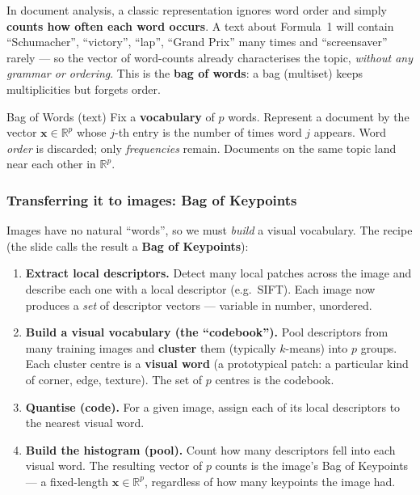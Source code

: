 \documentclass{report}
\newcommand{\R}{\mathbb{R}}
\newcommand{\xvec}{\mathbf{x}}
\begin{document}
In document analysis, a classic representation ignores word order and simply
\textbf{counts how often each word occurs}. A text about Formula~1 will contain
``Schumacher'', ``victory'', ``lap'', ``Grand Prix'' many times and
``screensaver'' rarely --- so the vector of word-counts already characterises
the topic, \emph{without any grammar or ordering}. This is the
\textbf{bag of words}: a bag (multiset) keeps multiplicities but forgets order.

\begin{defbox}{Bag of Words (text)}
Fix a \textbf{vocabulary} of $p$ words. Represent a document by the vector
$\xvec \in \R^p$ whose $j$-th entry is the number of times word $j$ appears.
Word \emph{order} is discarded; only \emph{frequencies} remain. Documents on the
same topic land near each other in $\R^p$.
\end{defbox}

\subsubsection{Transferring it to images: Bag of Keypoints}

Images have no natural ``words'', so we must \emph{build} a visual vocabulary.
The recipe (the slide calls the result a \textbf{Bag of Keypoints}):

\begin{enumerate}
\item \textbf{Extract local descriptors.} Detect many local patches across the
image and describe each one with a local descriptor (e.g.\ SIFT). Each image now
produces a \emph{set} of descriptor vectors --- variable in number, unordered.
\item \textbf{Build a visual vocabulary (the ``codebook'').} Pool descriptors
from many training images and \textbf{cluster} them (typically $k$-means) into
$p$ groups. Each cluster centre is a \textbf{visual word} (a prototypical
patch: a particular kind of corner, edge, texture). The set of $p$ centres is
the codebook.
\item \textbf{Quantise (code).} For a given image, assign each of its local
descriptors to the nearest visual word.
\item \textbf{Build the histogram (pool).} Count how many descriptors fell into
each visual word. The resulting vector of $p$ counts is the image's Bag of
Keypoints --- a fixed-length $\xvec \in \R^p$, regardless of how many keypoints
the image had.
\end{enumerate}
\end{document}
